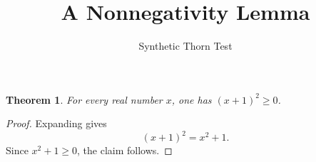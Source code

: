 \documentclass{article}
\newtheorem{theorem}{Theorem}
\begin{document}
\title{A Nonnegativity Lemma}
\author{Synthetic Thorn Test}
\maketitle

\begin{theorem}\label{thm:repairable-algebra}
For every real number $x$, one has $(x+1)^2\ge 0$.
\end{theorem}
\begin{proof}
Expanding gives
\[
(x+1)^2=x^2+1.
\]
Since $x^2+1\ge 0$, the claim follows.
\end{proof}
\end{document}
